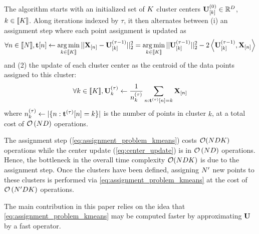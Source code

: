The algorithm starts with an initialized set of $K$ cluster centers ${\mathbf{U}}_{[k]}^{(0)} \in \mathbb{R}^D$, $k\in[\![K]\!]$. Along iterations indexed by $\tau$, it then alternates between (i) an assignment step where each point assignment is updated as
\begin{align}
\label{eq:assignment_problem_kmeans}
\forall n\in[\![N]\!], {\mathbf{t}}[n] \leftarrow \operatorname*{arg\,min}_{k \in [\![K]\!]} ||{\mathbf{X}}_{[n]} - {\mathbf{U}}_{[k]}^{(\tau-1)}||_2^2 = \operatorname*{arg\,min}_{k \in [\![K]\!]} ||{\mathbf{U}}_{[k]}^{(\tau-1)}||_2^2 - 2 \left <{\mathbf{U}}_{[k]}^{(\tau-1)}, {\mathbf{X}}_{[n]}\right >
\end{align}
and (2) the update of each cluster center as the centroid of the data points assigned to this cluster:
\begin{align}
\label{eq:center_update}
\forall k\in[\![K]\!], {\mathbf{U}}^{(\tau)}_k \leftarrow \frac{1}{n_k^{(\tau)}} \sum_{n: {\mathbf{t}}^{(\tau)}[n]= k} {{\mathbf{X}}_{[n]}}
\end{align}
where $n_k^{(\tau)} \leftarrow |\{n: {\mathbf{t}}^{(\tau)}[n]=k\}|$ is the number of points in cluster $k$, at a total cost of $\mathcal{O}\left (ND\right )$ operations.

The assignment step (\eqref{eq:assignment_problem_kmeans}) costs $\mathcal{O}(NDK)$ operations while the center update (\eqref{eq:center_update}) is in $\mathcal{O}\left (ND\right )$ operations. Hence, the bottleneck in the overall time complexity $\mathcal{O}(NDK)$ is due to the assignment step. Once the clusters have been defined, assigning $N'$ new points to these clusters is performed via \eqref{eq:assignment_problem_kmeans} at the cost of $\mathcal{O}\left (N'DK \right )$ operations.

The main contribution in this paper relies on the idea that \eqref{eq:assignment_problem_kmeans} may be computed faster by approximating ${\mathbf{U}}$ by a fast operator.

%

